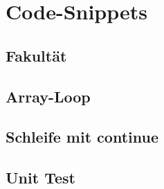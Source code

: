 \section{Code-Snippets}

\subsection{Fakultät}
    

\subsection{Array-Loop}{\label{Array-Loop}}
    

\subsection{Schleife mit continue}

\subsection{Unit Test}{\label{Unit-Test}}
